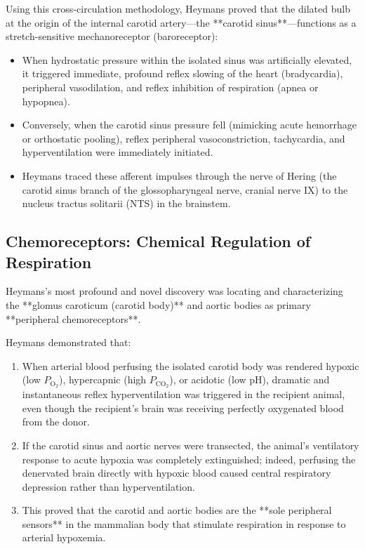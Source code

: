 Using this cross-circulation methodology, Heymans proved that the dilated bulb at the origin of the internal carotid artery—the **carotid sinus**—functions as a stretch-sensitive mechanoreceptor (baroreceptor):
\begin{itemize}
    \item When hydrostatic pressure within the isolated sinus was artificially elevated, it triggered immediate, profound reflex slowing of the heart (bradycardia), peripheral vasodilation, and reflex inhibition of respiration (apnea or hypopnea).
    \item Conversely, when the carotid sinus pressure fell (mimicking acute hemorrhage or orthostatic pooling), reflex peripheral vasoconstriction, tachycardia, and hyperventilation were immediately initiated.
    \item Heymans traced these afferent impulses through the nerve of Hering (the carotid sinus branch of the glossopharyngeal nerve, cranial nerve IX) to the nucleus tractus solitarii (NTS) in the brainstem.
\end{itemize}

\subsection{Chemoreceptors: Chemical Regulation of Respiration}

Heymans's most profound and novel discovery was locating and characterizing the **glomus caroticum (carotid body)** and aortic bodies as primary **peripheral chemoreceptors**.

Heymans demonstrated that:
\begin{enumerate}
    \item When arterial blood perfusing the isolated carotid body was rendered hypoxic (low $P_{\text{O}_2}$), hypercapnic (high $P_{\text{CO}_2}$), or acidotic (low pH), dramatic and instantaneous reflex hyperventilation was triggered in the recipient animal, even though the recipient's brain was receiving perfectly oxygenated blood from the donor.
    \item If the carotid sinus and aortic nerves were transected, the animal's ventilatory response to acute hypoxia was completely extinguished; indeed, perfusing the denervated brain directly with hypoxic blood caused central respiratory depression rather than hyperventilation.
    \item This proved that the carotid and aortic bodies are the **sole peripheral sensors** in the mammalian body that stimulate respiration in response to arterial hypoxemia.
\end{enumerate}

